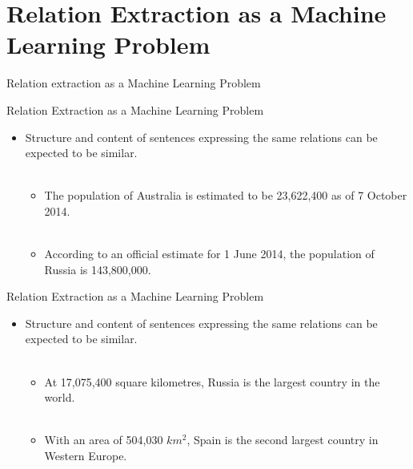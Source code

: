 \documentclass{beamer}
\begin{document}
\section{Relation Extraction as a Machine Learning Problem}
\begin{frame}
\begin{block}{Relation extraction as a Machine Learning Problem}
\end{block}
\end{frame}
\begin{frame}{Relation Extraction as a Machine Learning Problem}
 \begin{itemize}
  \item Structure and content of sentences expressing the same relations can be expected to be similar.  \\~\\
 \begin{itemize}
      \item The population of Australia is estimated to be 23,622,400 as of 7 October 2014. \\~\\
      \item According to an official estimate for 1 June 2014, the population of Russia is 143,800,000.   
   \end{itemize}   
 \end{itemize}
\end{frame}
\begin{frame}{Relation Extraction as a Machine Learning Problem}
\begin{itemize}
\item  Structure and content of sentences expressing the same relations can be expected to be similar.  \\~\\
 \begin{itemize}   
    \item At 17,075,400 square kilometres, Russia is the largest country in the world. \\~\\
    \item With an area of 504,030 $km^{2}$, Spain is the second largest country in Western Europe. 
    \end{itemize}
 \end{itemize}
\end{frame}
\end{document}
